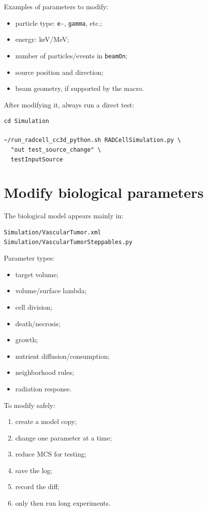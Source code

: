 \documentclass[11pt,a4paper,twoside,pdftex]{refrep}
\begin{document}
Examples of parameters to modify:

\begin{itemize}
  \item particle type: \texttt{e-}, \texttt{gamma}, etc.;
  \item energy: keV/MeV;
  \item number of particles/events in \texttt{beamOn};
  \item source position and direction;
  \item beam geometry, if supported by the macro.
\end{itemize}

After modifying it, always run a direct test:

\begin{lstlisting}
cd Simulation

~/run_radcell_cc3d_python.sh RADCellSimulation.py \
  "out test_source_change" \
  testInputSource
\end{lstlisting}

\section{Modify biological parameters}

The biological model appears mainly in:

\begin{lstlisting}
Simulation/VascularTumor.xml
Simulation/VascularTumorSteppables.py
\end{lstlisting}

Parameter types:

\begin{itemize}
  \item target volume;
  \item volume/surface lambda;
  \item cell division;
  \item death/necrosis;
  \item growth;
  \item nutrient diffusion/consumption;
  \item neighborhood rules;
  \item radiation response.
\end{itemize}

To modify safely:

\begin{enumerate}
  \item create a model copy;
  \item change one parameter at a time;
  \item reduce MCS for testing;
  \item save the log;
  \item record the diff;
  \item only then run long experiments.
\end{enumerate}
\end{document}

